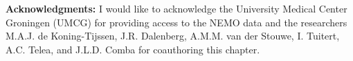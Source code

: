 \vspace{5mm} %

\noindent\textbf{Acknowledgments:} I would like to acknowledge the University Medical Center Groningen (UMCG) for providing access to the NEMO data and the researchers M.A.J. de Koning-Tijssen, J.R. Dalenberg, A.M.M. van der Stouwe, I. Tuitert, A.C. Telea, and J.L.D. Comba for coauthoring this chapter.